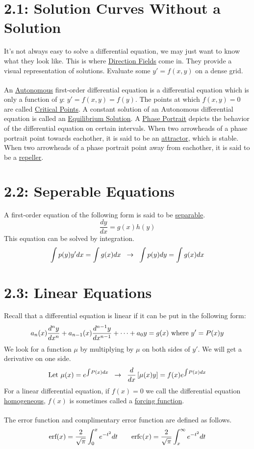 \documentclass{article}
\begin{document}
\section*{2.1: Solution Curves Without a Solution}
It's not always easy to solve a differential equation, we may just want to know what they look like. This is where \underline{Direction Fields} come in. They provide a visual representation of solutions. Evaluate some \(y'=f(x,y)\) on a dense grid.\\\\
An \underline{Autonomous} first-order differential equation is a differential equation which is only a function of \(y\): \(y'=f(x,y)=f(y)\). The points at which \(f(x,y)=0\) are called \underline{Critical Points}. A constant solution of an Autonomous differential equation is called an \underline{Equilibrium Solution}. A \underline{Phase Portrait} depicts the behavior of the differential equation on certain intervals. When two arrowheads of a phase portrait point towards eachother, it is said to be an \underline{attractor}, which is stable. When two arrowheads of a phase portrait point away from eachother, it is said to be a \underline{repeller}.
\section*{2.2: Seperable Equations}
A first-order equation of the following form is said to be \underline{separable}.
\[\frac{dy}{dx}=g(x)h(y)\]
This equation can be solved by integration.
\[\int p(y)y'dx=\int g(x)dx \hspace{2 mm}\rightarrow\hspace{2 mm}\int p(y)dy=\int g(x)dx\]
\section*{2.3: Linear Equations}
Recall that a differential equation is linear if it can be put in the following form:
\[a_n(x)\frac{d^ny}{dx^n}+a_{n-1}(x)\frac{d^{n-1}y}{dx^{n-1}}+\cdots+a_0y=g(x)\,\,\textnormal{where}\,\,y'=P(x)y\]
We look for a function \(\mu\) by multiplying by \(\mu\) on both sides of \(y'\). We will get a derivative on one side.
\[\textnormal{Let }\mu(x)=e^{\int\!P(x)dx}\hspace{2 mm}\rightarrow\hspace{2 mm}\frac{d}{dx}\left[\mu(x)y\right]=f(x)e^{\int\!P(x)dx}\]
For a linear differential equation, if \(f(x)=0\) we call the differential equation \underline{homogeneous}, \(f(x)\) is sometimes called a \underline{forcing function}.\\\\
The error function and complimentary error function are defined as follows.
\[\textnormal{erf}(x)=\frac{2}{\sqrt{\pi}}\int_0^xe^{-t^2}dt\hspace{7 mm}\textnormal{erfc}(x)=\frac{2}{\sqrt{\pi}}\int_x^\infty e^{-t^2}dt\]
\end{document}
